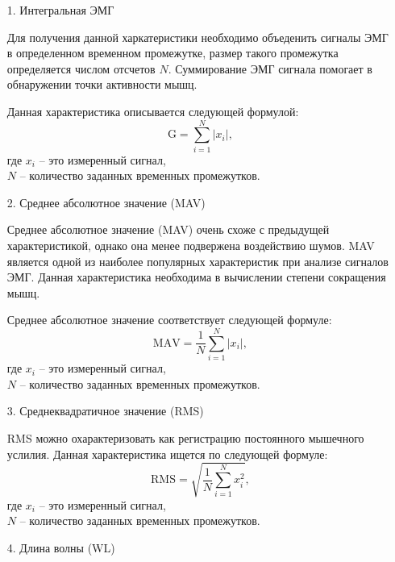 \begin{itemize}[parsep=0.4em]
    \setlength\itemsep{0.8em plus 0.2em minus 0.2em}
    \item[1.] Интегральная ЭМГ

        Для получения данной харкатеристики необходимо объеденить сигналы ЭМГ в определенном временном промежутке, размер такого промежутка определяется числом отсчетов $N$. Суммирование ЭМГ сигнала помогает в обнаружении точки активности мышц.

        Данная характеристика описывается следующей формулой:
        \begin{equation}
            \text{G} = \sum\limits_{i=1}^N \bigl|x_i\bigr|,
        \end{equation}
        где $x_i$ -- это измеренный сигнал,\\ \phantom{где} $N$ -- количество заданных временных промежутков.

    \item[2.] Среднее абсолютное значение (MAV)

        Среднее абсолютное значение (MAV) очень схоже с предыдущей характеристикой, однако она менее подвержена воздействию шумов. MAV является одной из наиболее популярных характеристик при анализе сигналов ЭМГ. Данная характеристика необходима в вычислении степени сокращения мышц.

        Среднее абсолютное значение соответствует следующей формуле:
        \begin{equation}
            \text{MAV} = \dfrac{1}{N}\sum\limits_{i=1}^N\bigl|x_i\bigr|,
        \end{equation}
        где $x_i$ -- это измеренный сигнал,\\ \phantom{где} $N$ -- количество заданных временных промежутков.

    \item[3.] Среднеквадратичное значение (RMS)

        RMS можно охарактеризовать как регистрацию постоянного мышечного услилия. Данная характеристика ищется по следующей формуле:
        \begin{equation}
            \text{RMS} = \sqrt{\dfrac{1}{N}\sum\limits_{i=1}^Nx_i^2},
        \end{equation}
        где $x_i$ -- это измеренный сигнал,\\ \phantom{где} $N$ -- количество заданных временных промежутков.

    \item[4.] Длина волны (WL)


\end{itemize}
